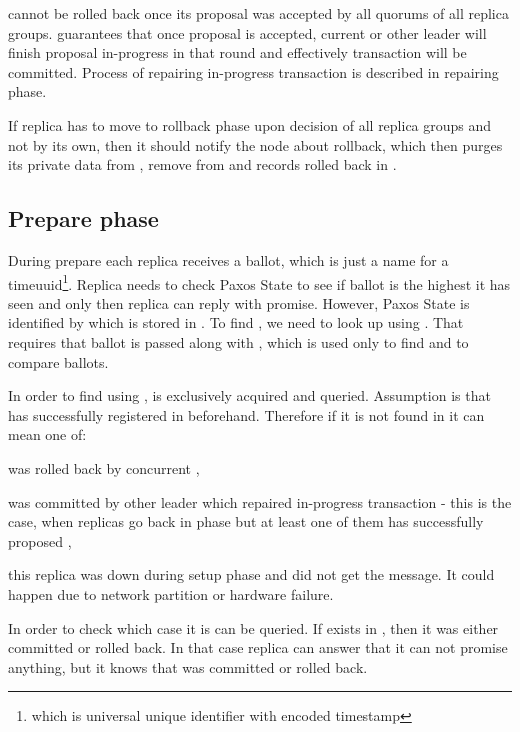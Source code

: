 \transaction cannot be rolled back once its proposal was accepted by all quorums of all replica groups. \paxos guarantees that once proposal is accepted, current or other leader will finish proposal in-progress in that round and effectively transaction will be committed. Process of repairing in-progress transaction is described in repairing phase.

If replica has to move to rollback phase upon decision of all replica groups and not by its own, then it should notify the node about rollback, which then purges its private data from \txStorage, remove \txState from \txIndex and records rolled back \transaction in \txLog.


\subsection{Prepare phase}
During prepare each replica receives a ballot, which is just a name for a timeuuid\footnote{which is universal unique identifier with encoded timestamp}. Replica needs to check Paxos State to see if ballot is the highest it has seen and only then replica can reply with promise. However, Paxos State is identified by \paxosRoundId which is stored in \txIndex. To find \paxosRoundId, we need to look up \txIndex using \txState. That requires that ballot is passed along with \txState, which is used only to find \paxosRoundId and to compare ballots.

In order to find \paxosRoundId using \txState, \txIndex is exclusively acquired and queried. Assumption is that \transaction has successfully registered in \txIndex beforehand. Therefore if it is not found in \txIndex it can mean one of:
\begin{enumerate*}[label=\alph*)]
\item \transaction was rolled back by concurrent \transactionj,
\item \transaction was committed by other leader which repaired in-progress transaction - this is the case, when replicas go back in phase but at least one of them has successfully proposed \txState,
\item this replica was down during setup phase and did not get the message. It could happen due to network partition or hardware failure.
\end{enumerate*}


In order to check which case it is \txLog can be queried. If \txState exists in \txLog, then it was either committed or rolled back. In that case replica can answer that it can not promise anything, but it knows that \transaction was committed or rolled back.

